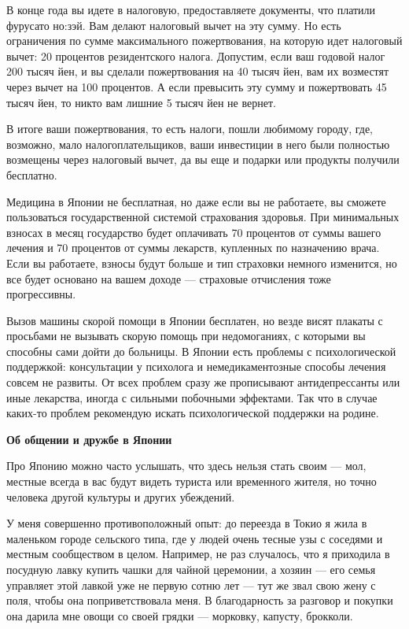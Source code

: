 В конце года вы идете в налоговую, предоставляете документы, что платили фурусато но:зэй. Вам делают налоговый вычет на эту сумму. Но есть ограничения по сумме максимального пожертвования, на которую идет налоговый вычет: 20 процентов резидентского налога. Допустим, если ваш годовой налог 200 тысяч йен, и вы сделали пожертвования на 40 тысяч йен, вам их возместят через вычет на 100 процентов. А если превысить эту сумму и пожертвовать 45 тысяч йен, то никто вам лишние 5 тысяч йен не вернет.

В итоге ваши пожертвования, то есть налоги, пошли любимому городу, где, возможно, мало налогоплательщиков, ваши инвестиции в него были полностью возмещены через налоговый вычет, да вы еще и подарки или продукты получили бесплатно.

Медицина в Японии не бесплатная, но даже если вы не работаете, вы сможете пользоваться государственной системой страхования здоровья. При минимальных взносах в месяц государство будет оплачивать 70 процентов от суммы вашего лечения и 70 процентов от суммы лекарств, купленных по назначению врача. Если вы работаете, взносы будут больше и тип страховки немного изменится, но все будет основано на вашем доходе — страховые отчисления тоже прогрессивны.

Вызов машины скорой помощи в Японии бесплатен, но везде висят плакаты с просьбами не вызывать скорую помощь при недомоганиях, с которыми вы способны сами дойти до больницы. В Японии есть проблемы с психологической поддержкой: консультации у психолога и немедикаментозные способы лечения совсем не развиты. От всех проблем сразу же прописывают антидепрессанты или иные лекарства, иногда с сильными побочными эффектами. Так что в случае каких-то проблем рекомендую искать психологической поддержки на родине.

\newpage
\textbf{Об общении и дружбе в Японии}

Про Японию можно часто услышать, что здесь нельзя стать своим — мол, местные всегда в вас будут видеть туриста или временного жителя, но точно человека другой культуры и других убеждений.

У меня совершенно противоположный опыт: до переезда в Токио я жила в маленьком городе сельского типа, где у людей очень тесные узы с соседями и местным сообществом в целом. Например, не раз случалось, что я приходила в посудную лавку купить чашки для чайной церемонии, а хозяин — его семья управляет этой лавкой уже не первую сотню лет — тут же звал свою жену с поля, чтобы она поприветствовала меня. В благодарность за разговор и покупки она дарила мне овощи со своей грядки — морковку, капусту, брокколи.

